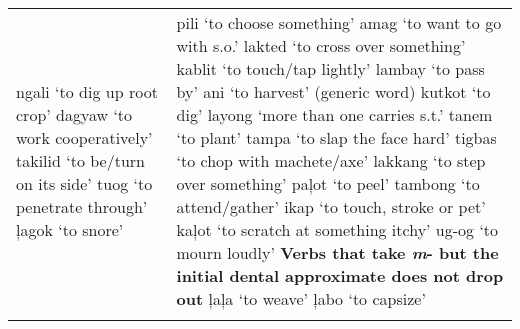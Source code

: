\begin{table}
\begin{tabular} {
        >{\RaggedRight\arraybackslash}p{5.6cm}
        >{\RaggedRight\arraybackslash}p{5.6cm}
                    }
ngali ‘to dig up root crop’\newline 
dagyaw ‘to work cooperatively’\newline 
takilid ‘to be/turn on its side’\newline 
tuog ‘to penetrate through’\newline 
ļagok ‘to snore’%
&
pili ‘to choose something’\newline 
amag ‘to want to go with s.o.’\newline 
lakted ‘to cross over something'\newline
kablit ‘to touch/tap lightly’\newline 
lambay ‘to pass by’ \newline
ani ‘to harvest’ (generic word) \newline
kutkot ‘to dig’\newline 
layong ‘more than one carries s.t.’\newline 
tanem ‘to plant’\newline 
tampa ‘to slap the face hard’\newline 
tigbas ‘to chop with machete/axe’\newline 
lakkang ‘to step over something’\newline 
paļot ‘to peel’\newline
tambong ‘to attend/gather’\newline 
ikap ‘to touch, stroke or pet’\newline 
kaļot ‘to scratch at something itchy’\newline
ug-og ‘to mourn loudly’\newline 
\textbf{Verbs that take \textit{m}{}- but the initial dental approximate does not drop out}\newline
ļaļa ‘to weave’\newline
ļabo ‘to capsize’ \\ %
\lspbottomrule
\end{tabular}
\end{table}

